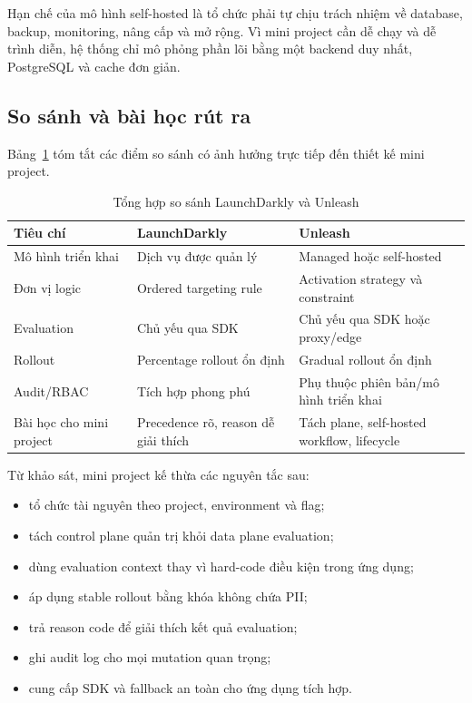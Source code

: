Hạn chế của mô hình self-hosted là tổ chức phải tự chịu trách nhiệm về database, backup, monitoring, nâng cấp và mở rộng. Vì mini project cần dễ chạy và dễ trình diễn, hệ thống chỉ mô phỏng phần lõi bằng một backend duy nhất, PostgreSQL và cache đơn giản.

\subsection{So sánh và bài học rút ra}

Bảng~\ref{tab:tong-hop-so-sanh-launchdarkly-unleash} tóm tắt các điểm so sánh có ảnh hưởng trực tiếp đến thiết kế mini project.

\begin{table}[H]
    \centering
    \caption{Tổng hợp so sánh LaunchDarkly và Unleash}
    \label{tab:tong-hop-so-sanh-launchdarkly-unleash}
    \begin{tabular}{p{} p{} p{}}
        \toprule
        \textbf{Tiêu chí} & \textbf{LaunchDarkly} & \textbf{Unleash} \\
        \midrule
        Mô hình triển khai & Dịch vụ được quản lý & Managed hoặc self-hosted \\
        Đơn vị logic & Ordered targeting rule & Activation strategy và constraint \\
        Evaluation & Chủ yếu qua SDK & Chủ yếu qua SDK hoặc proxy/edge \\
        Rollout & Percentage rollout ổn định & Gradual rollout ổn định \\
        Audit/RBAC & Tích hợp phong phú & Phụ thuộc phiên bản/mô hình triển khai \\
        Bài học cho mini project & Precedence rõ, reason dễ giải thích & Tách plane, self-hosted workflow, lifecycle \\
        \bottomrule
    \end{tabular}
\end{table}

Từ khảo sát, mini project kế thừa các nguyên tắc sau:

\begin{itemize}
    \item tổ chức tài nguyên theo project, environment và flag;
    \item tách control plane quản trị khỏi data plane evaluation;
    \item dùng evaluation context thay vì hard-code điều kiện trong ứng dụng;
    \item áp dụng stable rollout bằng khóa không chứa PII;
    \item trả reason code để giải thích kết quả evaluation;
    \item ghi audit log cho mọi mutation quan trọng;
    \item cung cấp SDK và fallback an toàn cho ứng dụng tích hợp.
\end{itemize}

